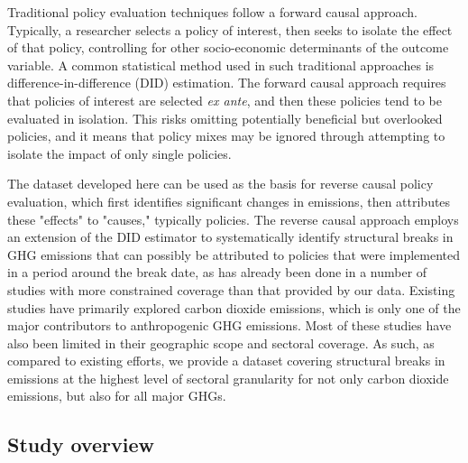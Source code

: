 \documentclass[a4paper]{article}
\begin{document}
Traditional policy evaluation techniques follow a forward causal approach. Typically, a researcher selects a policy of interest, then seeks to isolate the effect of that policy, controlling for other socio-economic determinants of the outcome variable. A common statistical method used in such traditional approaches is difference-in-difference (DID) estimation. The forward causal approach requires that policies of interest are selected \textit{ex ante}, and then these policies tend to be evaluated in isolation. This risks omitting potentially beneficial but overlooked policies, and it means that policy mixes may be ignored through attempting to isolate the impact of only single policies.

The dataset developed here can be used as the basis for reverse causal policy evaluation, which first identifies significant changes in emissions, then attributes these "effects" to "causes," typically policies. \cite{gelman2013ask} The reverse causal approach employs an extension of the DID estimator to systematically identify structural breaks in GHG emissions that can possibly be attributed to policies that were implemented in a period around the break date, as has already been done in a number of studies with more constrained coverage than that provided by our data. \cite{tebecis2023climate,koch2022attributing, yao2022structural, stechemesser2024climate} Existing studies have primarily explored carbon dioxide emissions, which is only one of the major contributors to anthropogenic GHG emissions. Most of these studies have also been limited in their geographic scope and sectoral coverage. As such, as compared to existing efforts, \cite{stechemesser2024climate} we provide a dataset covering structural breaks in emissions at the highest level of sectoral granularity for not only carbon dioxide emissions, but also for all major GHGs.

\subsection*{Study overview}
\end{document}
